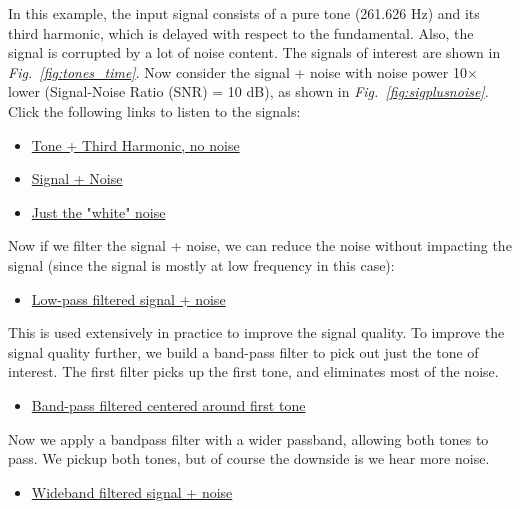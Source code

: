 In this example, the input signal consists of a pure tone (261.626 Hz) and its third harmonic, which is delayed with respect to the fundamental.  Also, the signal is corrupted by a lot of noise content.  The signals of interest are shown in \emph{Fig.~\ref{fig:tones_time}}.  Now consider the signal + noise with noise power 10$\times$ lower (Signal-Noise Ratio (SNR) = 10 dB), as shown in \emph{Fig.~\ref{fig:sigplusnoise}}.
Click the following links to listen to the signals:
    \begin{itemize}
        \item \href{http://rfic.eecs.berkeley.edu/~niknejad/photos/ee105/tones.mp3}{Tone + Third Harmonic, no noise}
        \item  \href{http://rfic.eecs.berkeley.edu/~niknejad/photos/ee105/tones\_noise.mp3}{Signal + Noise}
        \item \href{http://rfic.eecs.berkeley.edu/~niknejad/photos/ee105/noise.mp3}{Just the "white" noise}
    \end{itemize}	
Now if we filter the signal + noise, we can reduce the noise without impacting the signal (since the signal is mostly at low frequency in this case):
    \begin{itemize}
        \item  \href{http://rfic.eecs.berkeley.edu/~niknejad/photos/ee105/tones\_lpf.mp3}{Low-pass filtered signal + noise}
    \end{itemize}
 This is used extensively in practice to improve the signal quality.  To improve the signal quality further, we build a band-pass filter to pick out just the tone of interest.  The first filter picks up the first tone, and eliminates most of the noise.
    \begin{itemize}
        \item \href{http://rfic.eecs.berkeley.edu/~niknejad/photos/ee105/tones\_bpf\_wC.mp3}{Band-pass filtered centered around first tone}
    \end{itemize}
Now we apply a bandpass filter with a  wider passband, allowing both tones to pass.  We pickup both tones, but of course the downside is we hear more noise.
    \begin{itemize}
        \item  \href{http://rfic.eecs.berkeley.edu/~niknejad/photos/ee105/tones\_bpf.mp3}{Wideband filtered signal + noise} 
    \end{itemize}
